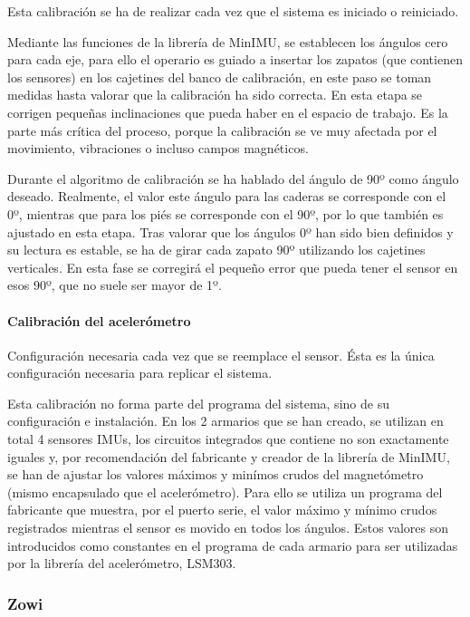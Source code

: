 Esta calibración se ha de realizar cada vez que el sistema es iniciado o reiniciado.

Mediante las funciones de la librería de MinIMU, se establecen los ángulos cero para cada eje, para ello el operario es guiado a insertar los zapatos (que contienen los sensores) en los cajetines del banco de calibración, en este paso se toman medidas hasta valorar que la calibración ha sido correcta. En esta etapa se corrigen pequeñas inclinaciones que pueda haber en el espacio de trabajo. Es la parte más crítica del proceso, porque la calibración se ve muy afectada por el movimiento, vibraciones o incluso campos magnéticos.

Durante el algoritmo de calibración se ha hablado del ángulo de 90º como ángulo deseado. Realmente, el valor este ángulo para las caderas se corresponde con el 0º, mientras que para los piés se corresponde con el 90º, por lo que también es ajustado en esta etapa. Tras valorar que los ángulos 0º han sido bien definidos y su lectura es estable, se ha de girar cada zapato 90º utilizando los cajetines verticales. En esta fase se corregirá el pequeño error que pueda tener el sensor en esos 90º, que no suele ser mayor de 1º.

\paragraph{Calibración del acelerómetro}

Configuración necesaria cada vez que se reemplace el sensor. Ésta es la única configuración necesaria para replicar el sistema.

Esta calibración no forma parte del programa del sistema, sino de su configuración e instalación. En los 2 armarios que se han creado, se utilizan en total 4 sensores IMUs, los circuitos integrados que contiene no son exactamente iguales y, por recomendación del fabricante y creador de la librería de MinIMU, se han de ajustar los valores máximos y minímos crudos del magnetómetro (mismo encapsulado que el acelerómetro). Para ello se utiliza un programa del fabricante que muestra, por el puerto serie, el valor máximo y mínimo crudos registrados mientras el sensor es movido en todos los ángulos. Estos valores son introducidos como constantes en el programa de cada armario para ser utilizadas por la librería del acelerómetro, LSM303.

\subsubsection{Zowi}

